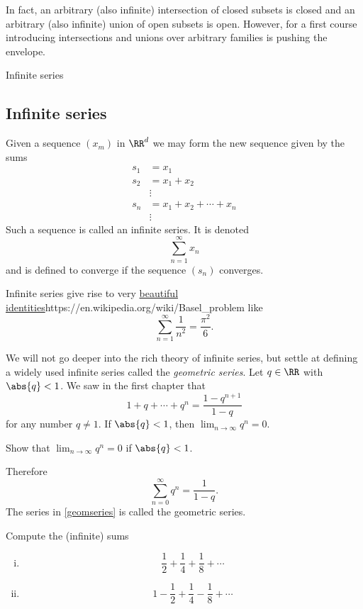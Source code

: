 \documentclass{article}
\begin{document}
  \begin{remark}
    In fact, an arbitrary (also infinite) intersection of closed subsets is closed and an arbitrary (also infinite) union of open subsets is open. However, for a
    first course introducing intersections and unions over arbitrary families is pushing the
    envelope.
  \end{remark}
  

\begin{hideinbutton}{Infinite series}
\subsection{Infinite series}

Given a sequence $(x_m)$ in $\RR^d$ we may form the new sequence given by the sums
\begin{align*}
  s_1 &= x_1\\
  s_2 &= x_1 + x_2\\
      &\vdots\\
  s_n &= x_1 + x_2 + \cdots + x_n\\
  &\vdots       
\end{align*}
Such a sequence is called an infinite series. It is denoted
$$
\sum_{n=1}^\infty x_n
$$
and is defined to converge if the sequence $(s_n)$ converges.

Infinite series give rise to very \url{beautiful identities}{https://en.wikipedia.org/wiki/Basel_problem} like
$$
\sum_{n=1}^\infty \frac{1}{n^2} = \frac{\pi^2}{6}.
$$

We will not go deeper into the rich theory of infinite series, but
settle at defining a widely used infinite series called the
\emph{geometric series}.  Let $q\in \RR$ with $\abs{q} < 1$. We saw in
the first chapter that
$$
1 + q + \cdots + q^n = \frac{1 - q^{n+1}}{1-q}
$$
for any number $q\neq 1$. If $\abs{q} < 1$, then $\lim_{n\to\infty} q^n = 0$.

\beginshex
Show that $\lim_{n\to\infty} q^n = 0$ if $\abs{q} < 1$.
\endshex

Therefore
\begin{equation}\label{geomseries}
  \sum_{n=0}^\infty q^n = \frac{1}{1-q}.
\end{equation}
The series in \eqref{geomseries} is called the geometric series.

\beginshex
Compute the (infinite) sums
\begin{enumerate}[(i)]
\item
  $$
  \frac{1}{2} + \frac{1}{4} + \frac{1}{8} + \cdots
  $$
\item
  $$
  1 - \frac{1}{2} + \frac{1}{4} - \frac{1}{8} + \cdots
  $$
\end{enumerate}
\endshex


\end{hideinbutton}
\end{document}
